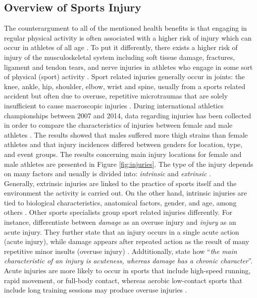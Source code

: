 \subsection{Overview of Sports Injury}\label{subsection:injury}
The counterargument to all of the mentioned health benefits is that engaging in regular physical activity is often associated with a higher risk of injury which can occur in athletes of all age \cite{van1997severity}. To put it differently, there exists a higher risk of injury of the musculoskeletal system including soft tissue
damage, fractures, ligament and tendon tears, and nerve injuries in athletes who engage in some sort of physical (sport) activity \cite{mayr2015prevention}. Sport related injuries generally occur in joints: the knee, ankle, hip, shoulder, elbow, wrist and spine, usually from a sports related accident but often due to overuse, repetitive microtraumas that are solely insufficient to cause macroscopic injuries
 \cite{mayr2015prevention}. During international athletics championships between 2007 and 2014, data regarding injuries has been collected in order to compare the characteristics of injuries between female and male athletes \cite{edouard2015sex}. The results showed that males suffered more thigh strains than female athletes and that injury incidences differed between genders for location, type, and event groups. The results concerning main injury locations for female and male athletes are presented in Figure \ref{fig:injuries}. The type of the injury depends on many factors and usually is divided into: \textit{intrinsic} and \textit{extrinsic} \cite{mayr2015prevention, lefevre2016major}. \\ Generally, extrinsic injuries are linked to the practice of sports itself and the environment the activity is carried out. On the other hand, intrinsic injuries are tied to biological characteristics, anatomical factors, gender, and age, among others \cite{mayr2015prevention}. Other sports specialists group sport related injuries differently. For instance, \cite{fischer2016causes} differentiate between \textit{damage} as an overuse injury and \textit{injury} as an acute injury. They further state that an injury occurs in a single acute action (acute injury), while damage appears after repeated action as the result of many repetitive minor insults (overuse injury) \cite{fischer2016causes}. Addtitionally, \cite{pecina1993overuse} state how ``\textit{the main characteristic of an injury is acuteness, whereas damage has a chronic character}''. \\Acute injuries are more likely to occur in sports that include high-speed running, rapid movement, or full-body contact, whereas aerobic low-contact sports that include long training sessions may produce overuse injuries  \cite{mayr2015prevention}.
